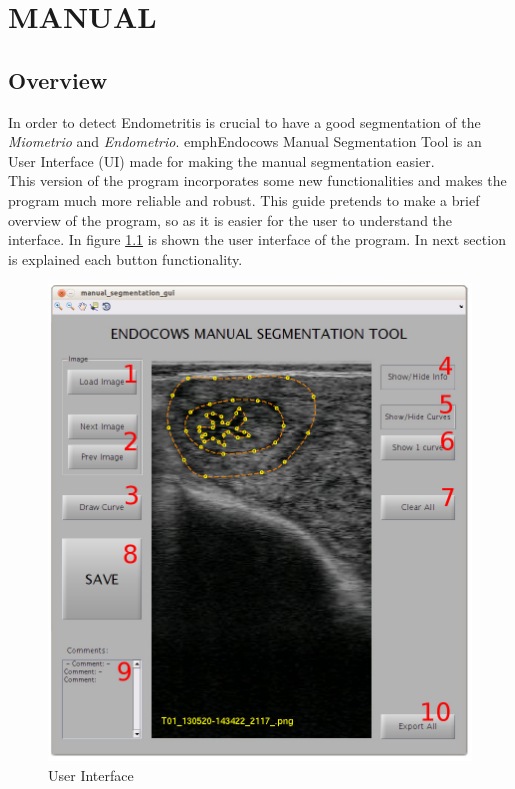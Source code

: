 \documentclass[12pt,a4paper,titlepage]{report}
\begin{document}
\chapter{MANUAL}

\section{Overview}

In order to detect Endometritis is crucial to have a good segmentation of the \emph{Miometrio} and \emph{Endometrio}. emph{Endocows Manual Segmentation Tool} is an User Interface (UI) made for making the manual segmentation easier.\\

This version of the program incorporates some new functionalities and makes the program much more reliable and robust. This guide pretends to make a brief overview of the program, so as it is easier for the user to understand the interface. In figure \ref{fig:interfaz} is shown the user interface of the program. In next section is explained each button functionality.

\begin{figure}[h!]
	\begin{center}
	\includegraphics[width=1\textwidth]{interfaz.jpg}
	\end{center}
	\caption{User Interface}
	\label{fig:interfaz}
\end{figure}
\end{document}

